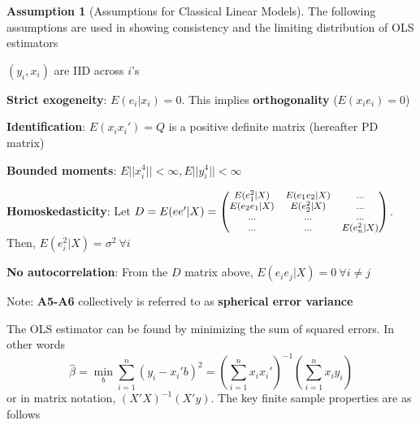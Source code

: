 \documentclass[12pt]{article}
\theoremstyle{definition}
\theoremstyle{property}
\theoremstyle{assumption}
\newtheorem{assumption}{Assumption}[section]
\theoremstyle{example}
\theoremstyle{comment}
\begin{document}
\begin{mdframed}[backgroundcolor=blue!5] 
\begin{assumption}[Assumptions for Classical Linear Models]
\item The following assumptions are used in showing consistency and the limiting distribution of OLS estimators
\begin{description}
\item[A1] $(y_i, x_i)$ are IID across $i$'s
\item[A2] \textbf{Strict exogeneity}: $E(e_i|x_i)=0$. This implies \textbf{orthogonality} ($E(x_ie_i)=0$)
\item[A3] \textbf{Identification}: $E(x_ix_i')=Q$ is a positive definite matrix (hereafter PD matrix)
\item[A4] \textbf{Bounded moments}: $E||x_i^4||<\infty, E||y_i^4||<\infty$
\item[A5] \textbf{Homoskedasticity}: Let $D=E(ee'|X)=\footnotesize{\begin{pmatrix} E(e_1^2|X) & E(e_1e_2|X)& ...\\ E(e_2e_1|X) & E(e_2^2|X) & ...\\ ...&...&...\\ ...&...&E(e_n^2|X)  \end{pmatrix}}$. \\Then, $E(e_i^2|X)=\sigma^2\ \forall i$ 
\item[A6] \textbf{No autocorrelation}: From the $D$ matrix above, $E(e_ie_j|X)=0 \ \forall i\neq j$
\item Note: \textbf{A5-A6} collectively is referred to as \textbf{spherical error variance}
\end{description}
\end{assumption}
\end{mdframed} \par
The OLS estimator can be found by minimizing the sum of squared errors. In other words
\[
\hat{\beta}=\min_b\sum_{i=1}^n (y_i-x_i'b)^2 = \left(\sum_{i=1}^nx_ix_i'\right)^{-1}\left(\sum_{i=1}^nx_iy_i\right)
\]
or in matrix notation, $(X'X)^{-1}(X'y)$. The key finite sample properties are as follows
\end{document}

